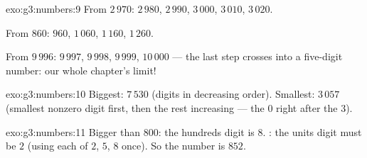 \begin{solution}{exo:g3:numbers:9}
From $2\,970$: $2\,980$, $2\,990$, $3\,000$, $3\,010$, $3\,020$.

From $860$: $960$, $1\,060$, $1\,160$, $1\,260$.

From $9\,996$: $9\,997$, $9\,998$, $9\,999$, $10\,000$ --- the last
step crosses into a five-digit number: our whole chapter's limit!
\end{solution}

\begin{solution}{exo:g3:numbers:10}
Biggest: $7\,530$ (digits in decreasing order). Smallest: $3\,057$
(smallest nonzero digit first, then the rest increasing --- the $0$
right after the $3$).
\end{solution}

\begin{solution}{exo:g3:numbers:11}
Bigger than $800$: the hundreds digit is $8$. : the units digit
must be $2$ (using each of $2$, $5$, $8$ once). So the number is
$852$.
\end{solution}
